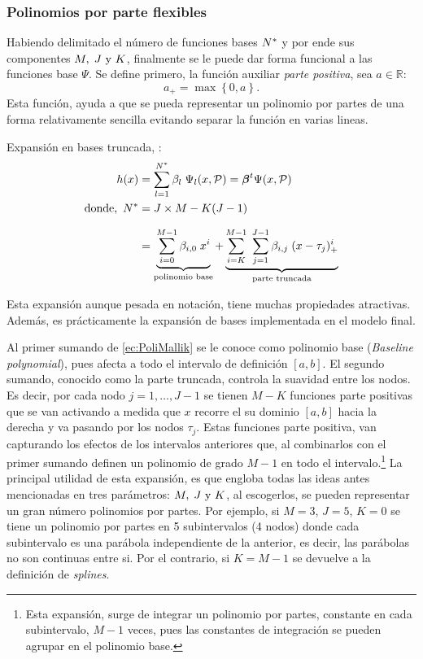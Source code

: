 \documentclass[../Main/Main.tex]{subfiles}
\begin{document}
\subsubsection*{Polinomios por parte flexibles} 
Habiendo delimitado el número de funciones bases $N^*$ y por ende sus componentes $M,\;J\text{ y }K$, finalmente se le puede dar forma funcional a las funciones base $\Psi$. Se define primero, la función auxiliar \textit{parte positiva}, sea $a \in \mathbb{R}$:
$$  a_+ = \max\left\{0,a\right\}.$$
Esta función, ayuda a que se pueda representar un polinomio por partes de una forma relativamente sencilla evitando separar la función en varias lineas. 

\begin{definition} Expansión en bases truncada, \citet{mallik1998automatic}:
\begin{align}
	h(x) &= \sum_{l = 1}^{N^*} \beta_l \; \Psi_l(x,\mathcal{P}) = \bm{\beta}^t\Psi(x,\mathcal{P})\label{ec:ExpBase_NEstrella} \\ 
	\text{donde, } \, N^* &= J\times M - K(J-1) \nonumber \\[7pt]
 		 &=	\underbrace{
	        \sum_{i = 0}^{M - 1} \beta_{i,0} \; x^{i}
 		    }_\text{polinomio base} + 
			\underbrace{
			\sum_{i = K}^{M-1} \;
	 		\sum_{j = 1}^{J-1}\beta_{i,j}\;(x - \tau_j)_+^{i}
	 		}_\text{parte truncada}
	 			\label{ec:PoliMallik}
\end{align}
\end{definition}
Esta expansión aunque pesada en notación, tiene muchas propiedades atractivas. Además, es prácticamente la expansión de bases implementada en el modelo final.

Al primer sumando de \eqref{ec:PoliMallik} se le conoce como polinomio base (\textit{Baseline polynomial}), pues afecta a todo el intervalo de definición $[a,b]$. El segundo sumando, conocido como la parte truncada, controla la suavidad entre los nodos. Es decir, por cada nodo $j = 1,\ldots,J-1$ se tienen $M - K$ funciones parte positivas que se van activando a medida que $x$ recorre el su dominio $[a,b]$ hacia la derecha y va pasando por los nodos $\tau_j$. Estas funciones parte positiva, van capturando los efectos de los intervalos anteriores que, al combinarlos con el primer sumando definen un polinomio de grado $M - 1$ en todo el intervalo.\footnote{Esta expansión, surge de integrar un polinomio por partes, constante en cada subintervalo, $M-1$ veces, pues las constantes de integración se pueden agrupar en el polinomio base.} La principal utilidad de esta expansión, es que engloba todas las ideas antes mencionadas en tres parámetros: $M,\;J\text{ y }K$, al escogerlos, se pueden representar un gran número polinomios por partes. Por ejemplo, si $M = 3$, $J = 5$, $K = 0$ se tiene un polinomio por partes en 5 subintervalos (4 nodos) donde cada subintervalo es una parábola independiente de la anterior, es decir, las parábolas no son continuas entre si. Por el contrario, si $K = M - 1$ se devuelve a la definición de \textit{splines}.
\end{document}
